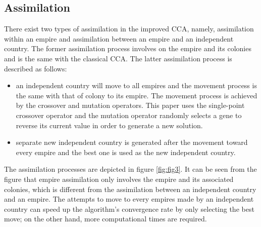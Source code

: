 \subsection{Assimilation}
There exist two types of assimilation in the improved CCA, namely, assimilation within an empire and assimilation between an empire and an independent country.
The former assimilation process involves on the empire and its colonies and is the same with the classical CCA.
The latter assimilation process is described as follows:
\begin{itemize}
	\item an independent country will move to all empires and the movement process is the same with that of colony to its empire.
	The movement process is achieved by the crossover and mutation operators.
	This paper uses the single-point crossover operator and the mutation operator randomly selects a gene to reverse its current value in order to generate a new solution.
	\item separate new independent country is generated after the movement toward every empire and the best one is  used as the new independent country.
\end{itemize}

The assimilation processes are depicted in figure \ref{fig:fig3}.
It can be seen from the figure that empire assimilation only involves the empire and its associated colonies, which is different from the assimilation between an independent country and an empire.
The attempts to move to every empires made by an independent country can speed up the algorithm's convergence rate by only selecting the best move; on the other hand, more computational times are required.

